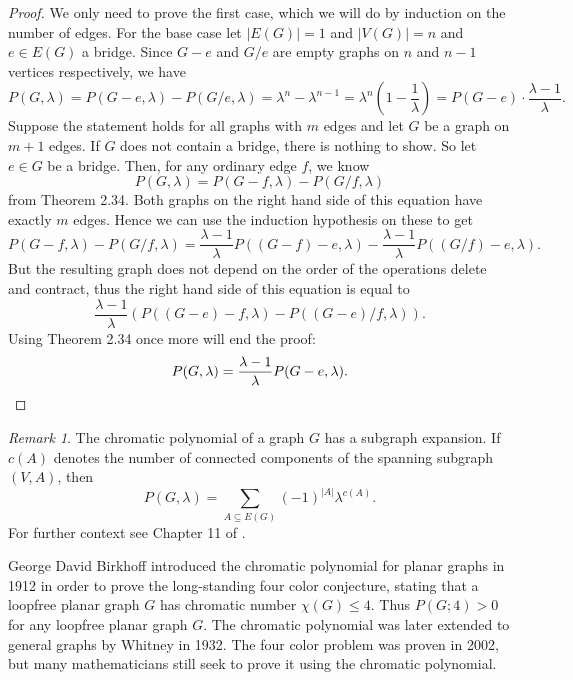 \documentclass[12pt,a4paper, twoside, autooneside=false]{scrartcl}
\theoremstyle{definition}
\theoremstyle{remark}
\newtheorem{remark}[theorem]{Remark}
\numberwithin{equation}{section}
\begin{document}
\begin{proof}
We only need to prove the first case, which we will do by induction on the number of edges. For the base case let $|E(G)| = 1$ and $|V(G)| = n$ and $e \in E(G)$ a bridge. Since $G - e$ and $G / e$ are empty graphs on $n$ and $n - 1$ vertices respectively, we have
\[
P(G, \lambda) = P(G - e, \lambda) - P(G / e, \lambda) = \lambda^{n}  - \lambda^{n - 1} = \lambda^n \left(1 - \frac{1}{\lambda}\right) = P(G - e) \cdot \frac{\lambda - 1}{\lambda}.
\]
Suppose the statement holds for all graphs with $m$ edges and let $G$ be a graph on $m + 1$ edges. If $G$ does not contain a bridge, there is nothing to show. So let $e \in G$ be a bridge. Then, for any ordinary edge $f$, we know 
\[
P(G, \lambda) = P(G - f, \lambda) - P(G / f, \lambda)
\]
from Theorem 2.34. Both graphs on the right hand side of this equation have exactly $m$ edges. Hence we can use the induction hypothesis on these to get
\[
P(G - f, \lambda) - P(G / f, \lambda) = \frac{\lambda - 1}{\lambda} P((G - f) - e, \lambda) - \frac{\lambda - 1}{\lambda} P((G / f) - e,\lambda).
\]
But the resulting graph does not depend on the order of the operations delete and contract, thus the right hand side of this equation is equal to
\[
 \frac{\lambda - 1}{\lambda } (P((G - e)- f, \lambda) - P((G - e) /f, \lambda)).
\]
Using Theorem 2.34 once more will end the proof:
\[
P(G, \lambda) = \frac{\lambda - 1}{\lambda} P(G - e, \lambda). \qedhere
\]
\end{proof}
\begin{remark}
The chromatic polynomial of a graph $G$ has a subgraph expansion. If $c(A)$ denotes the number of connected components of the spanning subgraph $(V,A)$, then 
\[
P(G,\lambda) = \sum_{A \subseteq E(G)} (-1)^{|A|} \lambda^{c(A)}.
\] For further context see Chapter 11 of \cite{ElMo2022}. 
\end{remark}
George David Birkhoff introduced the chromatic polynomial for planar graphs in 1912 in order to prove the long-standing four color conjecture, stating that a loopfree planar graph $G$ has chromatic number $\chi(G) \leq 4$. Thus $P(G;4) > 0$ for any loopfree planar graph $G$. The chromatic polynomial was later extended to general graphs by Whitney in 1932. The four color problem was proven in 2002, but many mathematicians still seek to prove it using the chromatic polynomial.
\end{document}
